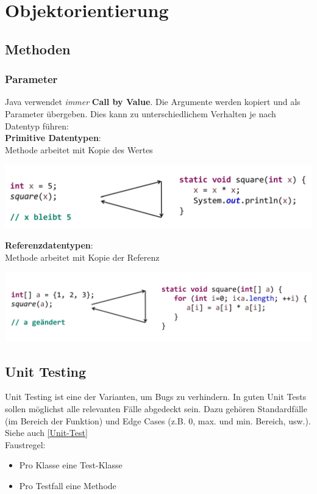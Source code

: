 \section{Objektorientierung}

\subsection{Methoden}

\subsubsection{Parameter}
Java verwendet \textit{immer} \textbf{Call by Value}. Die Argumente werden kopiert und als Parameter übergeben. Dies kann zu unterschiedlichem Verhalten
je nach Datentyp führen:\\

\textbf{Primitive Datentypen}:\\
Methode arbeitet mit Kopie des Wertes
\begin{center}
    \includegraphics[width=0.9\columnwidth]{pictures/primitive-params.png}    
\end{center}

\textbf{Referenzdatentypen}:\\
Methode arbeitet mit Kopie der Referenz
\begin{center}
    \includegraphics[width=0.9\columnwidth]{pictures/reference-params.png}    
\end{center}

\subsection{Unit Testing}
Unit Testing ist eine der Varianten, um Bugs zu verhindern. In guten Unit Tests sollen möglichst alle relevanten Fälle abgedeckt sein.
Dazu gehören Standardfälle (im Bereich der Funktion) und Edge Cases (z.B. 0, max. und min. Bereich, usw.). Siehe auch \ref{Unit-Test}\\
Faustregel:
\begin{itemize}
    \item Pro Klasse eine Test-Klasse
    \item Pro Testfall eine Methode
\end{itemize}

